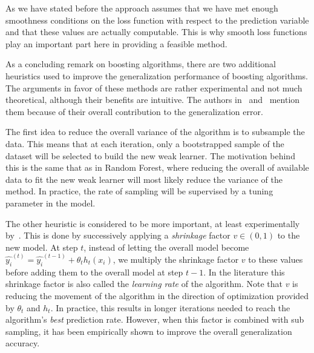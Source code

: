 As we have stated before the approach assumes that we have met enough smoothness conditions on the loss function with respect to the prediction variable
and that these values are actually computable. This is why smooth loss functions play an important part here in providing a feasible method.





As a concluding remark on boosting algorithms, there are two additional heuristics used to improve the generalization performance of boosting algorithms. The arguments in favor of these methods are rather experimental and not much theoretical, although their benefits are intuitive. The authors in~\textcite{hastie-elemstatslearn} and~\textcite{bishop-patternRecognition} mention them because of their overall contribution to the generalization error.

The first idea to reduce the overall variance of the algorithm is to subsample the data. This means that at each iteration, only a bootstrapped sample of the dataset will be selected to build the new weak learner. The motivation behind this is the same that as in Random Forest, where reducing the overall of available data to fit the new weak learner will most likely reduce the variance of the method. In practice, the rate of sampling will be supervised by a tuning parameter in the model.

The other heuristic is considered to be more important, at least experimentally by~\textcite{hastie-elemstatslearn}. This is done by successively applying a \textit{shrinkage} factor $v \in (0,1)$ to the new model. At step $t$, instead of letting the overall model become $ \hat{y_i}^{(t)} = \hat{y_i}^{(t-1)} + \theta_t h_t(x_i) $, we multiply the shrinkage factor $v$ to these values before adding them to the overall model at step $t-1$. In the literature this shrinkage factor is also called the \textit{learning rate} of the algorithm. Note that $v$ is reducing the movement of the algorithm in the direction of optimization provided by $\theta_t$ and $h_t$. In practice, this results in longer iterations needed to reach the algorithm's \textit{best} prediction rate. However, when this factor is combined with sub sampling, it has been empirically shown to improve the overall generalization accuracy.


